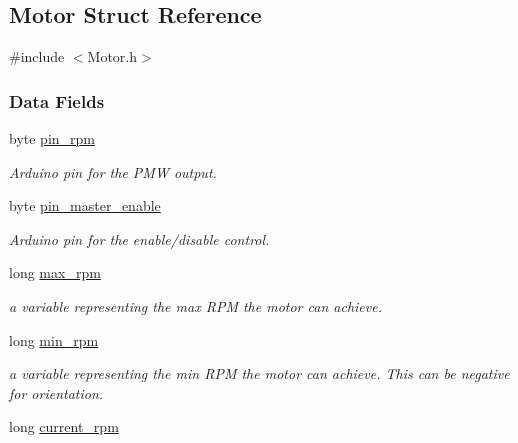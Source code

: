 \hypertarget{struct_motor}{\subsection{Motor Struct Reference}
\label{struct_motor}
}


{\ttfamily \#include $<$Motor.\+h$>$}

\subsubsection*{Data Fields}
\begin{DoxyCompactItemize}
\item 
\hypertarget{struct_motor_a9f878eebf9fd39151c3b280ef419b613}{byte \hyperlink{struct_motor_a9f878eebf9fd39151c3b280ef419b613}{pin\+\_\+rpm}}\label{struct_motor_a9f878eebf9fd39151c3b280ef419b613}

\begin{DoxyCompactList}\small\item\em Arduino pin for the P\+M\+W output. \end{DoxyCompactList}\item 
\hypertarget{struct_motor_ac5dd8a7e927385fe94901006430c728a}{byte \hyperlink{struct_motor_ac5dd8a7e927385fe94901006430c728a}{pin\+\_\+master\+\_\+enable}}\label{struct_motor_ac5dd8a7e927385fe94901006430c728a}

\begin{DoxyCompactList}\small\item\em Arduino pin for the enable/disable control. \end{DoxyCompactList}\item 
\hypertarget{struct_motor_a8e744cce5b217526ef96872c1d01e9dc}{long \hyperlink{struct_motor_a8e744cce5b217526ef96872c1d01e9dc}{max\+\_\+rpm}}\label{struct_motor_a8e744cce5b217526ef96872c1d01e9dc}

\begin{DoxyCompactList}\small\item\em a variable representing the max R\+P\+M the motor can achieve. \end{DoxyCompactList}\item 
\hypertarget{struct_motor_ad1981c2d8b92ac445457f155c5a55604}{long \hyperlink{struct_motor_ad1981c2d8b92ac445457f155c5a55604}{min\+\_\+rpm}}\label{struct_motor_ad1981c2d8b92ac445457f155c5a55604}

\begin{DoxyCompactList}\small\item\em a variable representing the min R\+P\+M the motor can achieve. This can be negative for orientation. \end{DoxyCompactList}\item 
\hypertarget{struct_motor_a018fb09622ed6ea50c42a667b18b37d3}{long \hyperlink{struct_motor_a018fb09622ed6ea50c42a667b18b37d3}{current\+\_\+rpm}}\label{struct_motor_a018fb09622ed6ea50c42a667b18b37d3}


\end{DoxyCompactItemize}

